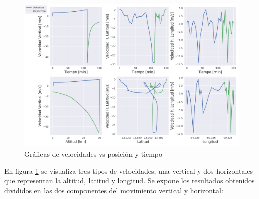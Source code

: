 \newpage

\begin{figure}[ht]
    \centering
    \includegraphics[width=0.77\linewidth]{document/figures/03_graficas_tiempo_altitud_vs_velocidad.png}
    \caption{Gráficas de velocidades vs posición y tiempo}
    \label{fig:velocidades_posicon_y_tiempo}
\end{figure}

\small
En figura \ref{fig:velocidades_posicon_y_tiempo} se visualiza  tres tipos de velocidades, una vertical y dos horizontales que representan la altitud, latitud y longitud. Se expone los resultados obtenidos divididos en las dos componentes del movimiento vertical y horizontal:

